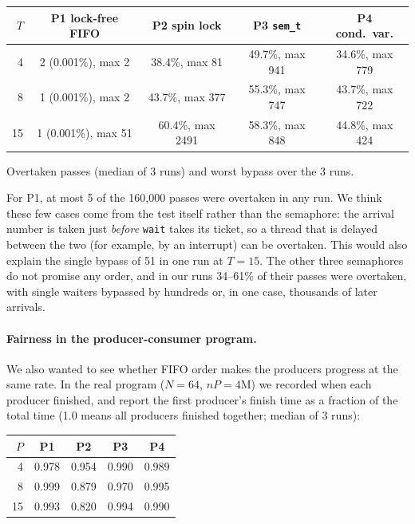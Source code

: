 \begin{center}\small
\begin{tabular}{rcccc}
\toprule
$T$ & P1 lock-free FIFO & P2 spin lock & P3 \texttt{sem\_t} & P4 cond.\ var. \\
\midrule
4  & 2 \;(0.001\%), max 2  & 38.4\%, max 81   & 49.7\%, max 941 & 34.6\%, max 779 \\
8  & 1 \;(0.001\%), max 2  & 43.7\%, max 377  & 55.3\%, max 747 & 43.7\%, max 722 \\
15 & 1 \;(0.001\%), max 51 & 60.4\%, max 2491 & 58.3\%, max 848 & 44.8\%, max 424 \\
\bottomrule
\end{tabular}

\smallskip
{\footnotesize Overtaken passes (median of 3 runs) and worst bypass over the 3 runs.}
\end{center}

For P1, at most 5 of the 160{,}000 passes were overtaken in any run. We think these few cases come from the test itself rather than the semaphore:
the arrival number is taken just \emph{before} \texttt{wait} takes its ticket, so a thread that is delayed between the two (for example, by an interrupt) can be overtaken.
This would also explain the single bypass of 51 in one run at $T=15$. The other three semaphores do not promise any order, and in our runs
34--61\% of their passes were overtaken, with single waiters bypassed by hundreds or, in one case, thousands of later arrivals.

\paragraph{Fairness in the producer-consumer program.}
We also wanted to see whether FIFO order makes the producers progress at the same rate. In the real program ($N=64$, $nP=4$M) we recorded when each producer finished,
and report the first producer's finish time as a fraction of the total time (1.0 means all producers finished together; median of 3 runs):

\begin{center}\small
\begin{tabular}{rcccc}
\toprule
$P$ & P1 & P2 & P3 & P4 \\
\midrule
4  & 0.978 & 0.954 & 0.990 & 0.989 \\
8  & 0.999 & 0.879 & 0.970 & 0.995 \\
15 & 0.993 & 0.820 & 0.994 & 0.990 \\
\bottomrule
\end{tabular}
\end{center}

